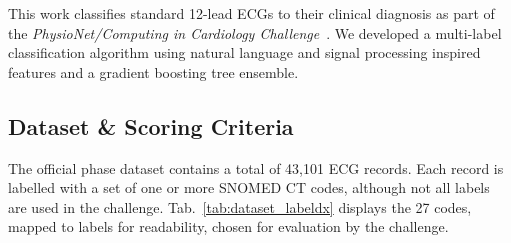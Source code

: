 \documentclass[twocolumn]{cinc}
\begin{document}
This work classifies standard 12-lead ECGs to their clinical diagnosis as part of the \emph{PhysioNet/Computing in Cardiology Challenge}~\cite{physionet_challenge_2020}.
We developed a multi-label classification algorithm using natural language and signal processing inspired features and a gradient boosting tree ensemble.

\subsection{Dataset \& Scoring Criteria}

The official phase dataset contains a total of 43,101 ECG records.
Each record is labelled with a set of one or more SNOMED CT codes, although not all labels are used in the challenge.
Tab.~\ref{tab:dataset_labeldx} displays the 27 codes, mapped to labels for readability, chosen for evaluation by the challenge.
\end{document}
